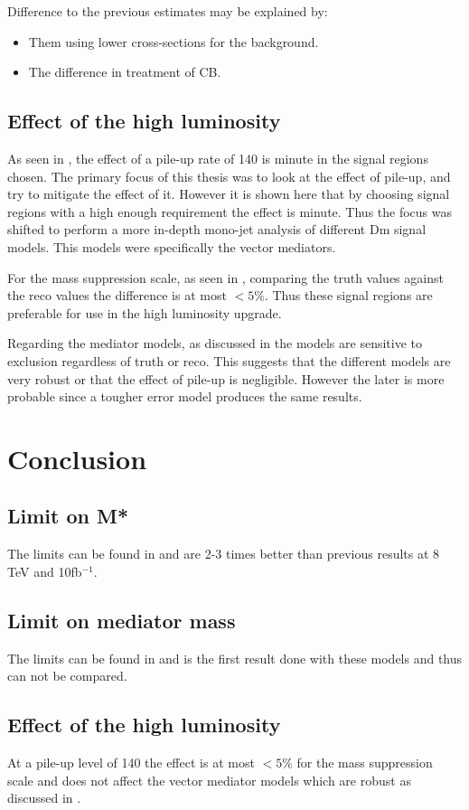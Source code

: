 Difference to the previous estimates may be explained by: 
\begin{itemize}
\item Them using lower cross-sections for the background.
\item The difference in treatment of CB.
\end{itemize}

\subsection{Effect of the high luminosity}\label{subsec:hleff}
As seen in , the effect of a pile-up rate of 140 is minute in the signal regions chosen. The primary focus of this thesis was to look at the effect of pile-up, and try to mitigate the effect of it. However it is shown here that by choosing signal regions with a high enough requirement the effect is minute. Thus the focus was shifted to perform a more in-depth mono-jet analysis of different Dm signal models. This models were specifically the vector mediators.

For the mass suppression scale, as seen in , comparing the truth values against the reco values the difference is at most $<5 \% $. Thus these signal regions are preferable for use in the high luminosity upgrade. 

Regarding the mediator models, as discussed in  the models are sensitive to exclusion regardless of truth or reco. This suggests that the different models are very robust or that the effect of pile-up is negligible. However the later is more probable since a tougher error model produces the same results.

\newpage
\section{Conclusion}
\subsection{Limit on M*}
The limits can be found in  and are 2-3 times better than previous results at 8 TeV and 10fb$^{-1}$.

\subsection{Limit on mediator mass}
The limits can be found in  and is the first result done with these models and thus can not be compared.

\subsection{Effect of the high luminosity}
At a pile-up level of 140 the effect is at most $<5\%$ for the mass suppression scale and does not affect the vector mediator models which are robust as discussed in .